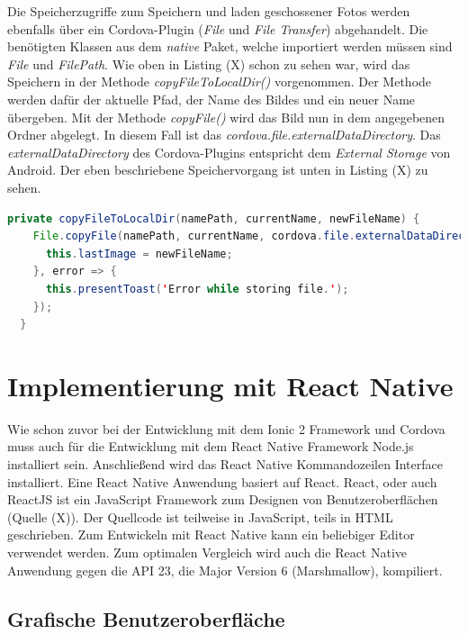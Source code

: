 Die Speicherzugriffe zum Speichern und laden geschossener Fotos werden ebenfalls über ein Cordova-Plugin (\textit{File} und \textit{File Transfer}) abgehandelt. Die benötigten Klassen aus dem \textit{native} Paket, welche importiert werden müssen sind \textit{File} und \textit{FilePath}. Wie oben in Listing (X) schon zu sehen war, wird das Speichern in der Methode \textit{copyFileToLocalDir()} vorgenommen. Der Methode werden dafür der aktuelle Pfad, der Name des Bildes und ein neuer Name übergeben. Mit der Methode \textit{copyFile()} wird das Bild nun in dem angegebenen Ordner abgelegt. In diesem Fall ist das \textit{cordova.file.externalDataDirectory}. Das \textit{externalDataDirectory} des Cordova-Plugins entspricht dem \textit{External Storage} von Android. Der eben beschriebene Speichervorgang ist unten in Listing (X) zu sehen. 
\clearpage

\begin{lstlisting}[caption=Methode \textit{copyFileToLocalDir()} zum Speichern der aufgenommenen Bilder, label=lst:SavePictureIonic, language=Java]
private copyFileToLocalDir(namePath, currentName, newFileName) {
    File.copyFile(namePath, currentName, cordova.file.externalDataDirectory, newFileName).then(success => {
      this.lastImage = newFileName;
    }, error => {
      this.presentToast('Error while storing file.');
    });
  }
\end{lstlisting}


\section{Implementierung mit React Native}

Wie schon zuvor bei der Entwicklung mit dem Ionic 2 Framework und Cordova muss auch für die Entwicklung mit dem React Native Framework Node.js installiert sein. Anschließend wird das React Native Kommandozeilen Interface installiert. Eine React Native Anwendung basiert auf React. React, oder auch ReactJS ist ein JavaScript Framework zum Designen von Benutzeroberflächen (Quelle (X)). Der Quellcode ist teilweise in JavaScript, teils in HTML geschrieben. Zum Entwickeln mit React Native kann ein beliebiger Editor verwendet werden. Zum optimalen Vergleich wird auch die React Native Anwendung gegen die API 23, die Major Version 6 (Marshmallow), kompiliert.  

\subsection*{Grafische Benutzeroberfläche}

